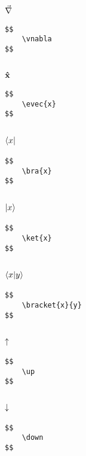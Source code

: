 \documentclass[a4paper]{article}
\begin{document}
\subsection{$ \vec{\nabla}$}

\begin{verbatim}
$$
	\vnabla
$$
\end{verbatim}

\subsection{$ \mathbf{\hat{x}}$}

\begin{verbatim}
$$
	\evec{x}
$$
\end{verbatim}

\subsection{$ \langle x|$}

\begin{verbatim}
$$
	\bra{x}
$$
\end{verbatim}

\subsection{$ |x\rangle$}

\begin{verbatim}
$$
	\ket{x}
$$
\end{verbatim}

\subsection{$ \langle x| y\rangle$}

\begin{verbatim}
$$
	\bracket{x}{y}
$$
\end{verbatim}

\subsection{$ \uparrow$}

\begin{verbatim}
$$
	\up
$$
\end{verbatim}

\subsection{$ \downarrow$}

\begin{verbatim}
$$
	\down
$$
\end{verbatim}
\end{document}
